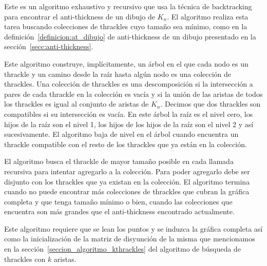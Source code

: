   Este es un algoritmo exhaustivo y recursivo que usa la técnica de backtracking para encontrar el
  anti-thickness de un dibujo de $K_n$. El algoritmo realiza esta tarea buscando colecciones de thrackles
  cuyo tamaño sea mínimo, como en la definición~\ref{definicion:at_dibujo} de anti-thickness de un dibujo
  presentado en la sección~\ref{secc:anti-thickness}.

  Este algoritmo construye, implícitamente, un árbol en el que cada nodo es un thrackle y un camino desde
  la raíz hasta algún nodo es una colección de thrackles. Una colección de thrackles es una descomposición
  si la intersección a pares de cada thrackle en la colección es vacía y si la unión de las aristas de
  todos los thrackles es igual al conjunto de aristas de $K_n$. Decimos que dos thrackles son compatibles
  si su intersección es vacía. En este árbol la raíz es el nivel cero, los hijos de la raíz son el nivel 1,
  los hijos de los hijos de la raíz son el nivel 2 y así sucesivamente. El algoritmo baja de nivel en el
  árbol cuando encuentra un thrackle compatible con el resto de los thrackles que ya están en la colección.

  El algoritmo busca el thrackle de mayor tamaño posible en cada llamada recursiva para intentar agregarlo
  a la colección. Para poder agregarlo debe ser disjunto con los thrackles que ya existan en la colección.
  El algoritmo termina cuando no puede encontrar más colecciones de thrackles que cubran la gráfica
  completa y que tenga tamaño mínimo o bien, cuando las colecciones que encuentra son más grandes que el
  anti-thickness encontrado actualmente.

  Este algoritmo requiere que se lean los puntos y se induzca la gráfica completa así como la inicialización
  de la matriz de disyunción de la misma que mencionamos en la sección~\ref{seccion_algoritmo_kthrackles}
  del algoritmo de búsqueda de thrackles con $k$ aristas.

